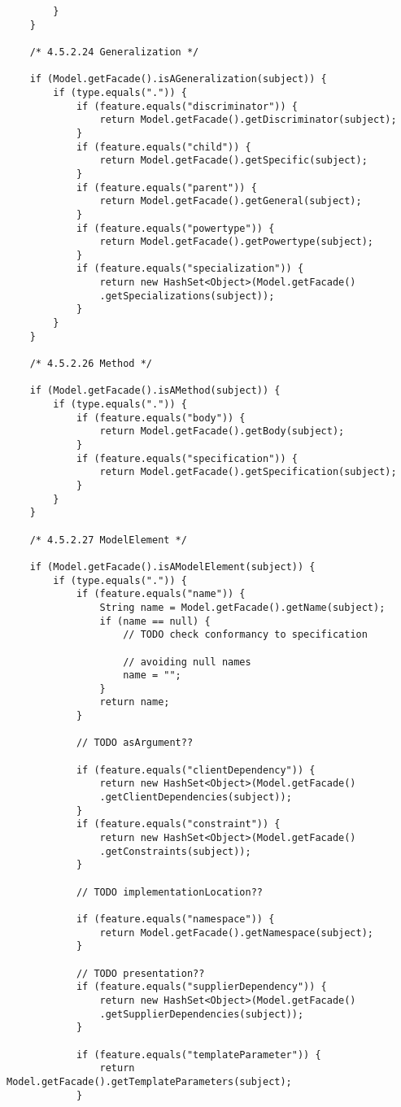 \begin{mdframed}
\begin{lstlisting}
		}
	}                
	
	/* 4.5.2.24 Generalization */          
	
	if (Model.getFacade().isAGeneralization(subject)) {
		if (type.equals(".")) {
			if (feature.equals("discriminator")) {
				return Model.getFacade().getDiscriminator(subject);
			}
			if (feature.equals("child")) {
				return Model.getFacade().getSpecific(subject);
			}
			if (feature.equals("parent")) {
				return Model.getFacade().getGeneral(subject);
			}
			if (feature.equals("powertype")) {
				return Model.getFacade().getPowertype(subject);
			}
			if (feature.equals("specialization")) {
				return new HashSet<Object>(Model.getFacade()
				.getSpecializations(subject));
			}                
		}
	}                
	
	/* 4.5.2.26 Method */          
	
	if (Model.getFacade().isAMethod(subject)) {
		if (type.equals(".")) {
			if (feature.equals("body")) {
				return Model.getFacade().getBody(subject);
			}
			if (feature.equals("specification")) {
				return Model.getFacade().getSpecification(subject);
			}
		}
	}
	
	/* 4.5.2.27 ModelElement */          
	
	if (Model.getFacade().isAModelElement(subject)) {
		if (type.equals(".")) {
			if (feature.equals("name")) {
				String name = Model.getFacade().getName(subject);
				if (name == null) {
					// TODO check conformancy to specification
					
					// avoiding null names
					name = "";
				}
				return name;
			}
			
			// TODO asArgument??
			
			if (feature.equals("clientDependency")) {
				return new HashSet<Object>(Model.getFacade()
				.getClientDependencies(subject));
			}                
			if (feature.equals("constraint")) {
				return new HashSet<Object>(Model.getFacade()
				.getConstraints(subject));
			}
			
			// TODO implementationLocation??
			
			if (feature.equals("namespace")) {
				return Model.getFacade().getNamespace(subject);
			}                
			
			// TODO presentation??                
			if (feature.equals("supplierDependency")) {
				return new HashSet<Object>(Model.getFacade()
				.getSupplierDependencies(subject));
			}                
			
			if (feature.equals("templateParameter")) {
				return Model.getFacade().getTemplateParameters(subject);
			}
			

\end{lstlisting}
\end{mdframed}

